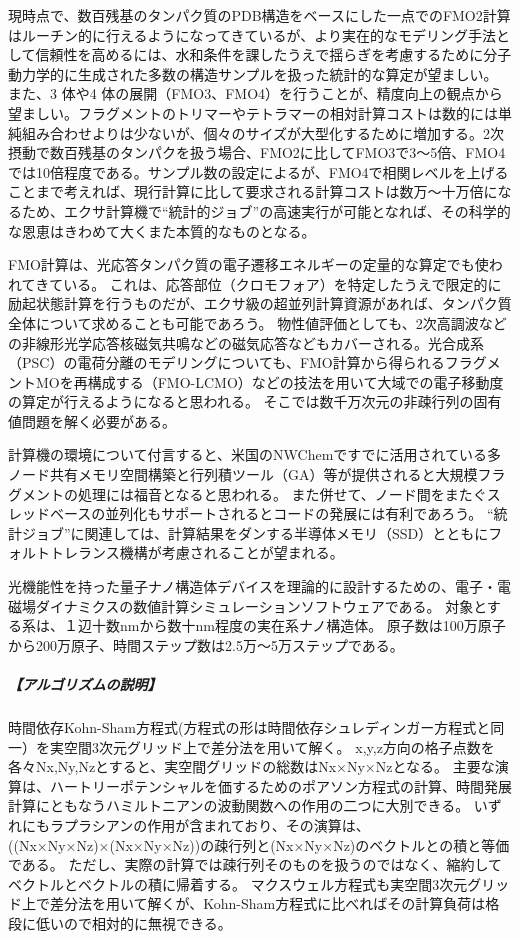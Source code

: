 現時点で、数百残基のタンパク質のPDB構造をベースにした一点でのFMO2計算はルーチン的に行えるようになってきているが、より実在的なモデリング手法として信頼性を高めるには、水和条件を課したうえで揺らぎを考慮するために分子動力学的に生成された多数の構造サンプルを扱った統計的な算定が望ましい。
また、3 体や4 体の展開（FMO3、FMO4）を行うことが、精度向上の観点から望ましい。フラグメントのトリマーやテトラマーの相対計算コストは数的には単純組み合わせよりは少ないが、個々のサイズが大型化するために増加する。2次摂動で数百残基のタンパクを扱う場合、FMO2に比してFMO3で3～5倍、FMO4では10倍程度である。サンプル数の設定によるが、FMO4で相関レベルを上げることまで考えれば、現行計算に比して要求される計算コストは数万～十万倍になるため、エクサ計算機で“統計的ジョブ”の高速実行が可能となれば、その科学的な恩恵はきわめて大くまた本質的なものとなる。

FMO計算は、光応答タンパク質の電子遷移エネルギーの定量的な算定でも使われてきている。
これは、応答部位（クロモフォア）を特定したうえで限定的に励起状態計算を行うものだが、エクサ級の超並列計算資源があれば、タンパク質全体について求めることも可能であろう。
物性値評価としても、2次高調波などの非線形光学応答核磁気共鳴などの磁気応答などもカバーされる。光合成系（PSC）の電荷分離のモデリングについても、FMO計算から得られるフラグメントMOを再構成する（FMO-LCMO）などの技法を用いて大域での電子移動度の算定が行えるようになると思われる。
そこでは数千万次元の非疎行列の固有値問題を解く必要がある。

計算機の環境について付言すると、米国のNWChemですでに活用されている多ノード共有メモリ空間構築と行列積ツール（GA）等が提供されると大規模フラグメントの処理には福音となると思われる。
また併せて、ノード間をまたぐスレッドベースの並列化もサポートされるとコードの発展には有利であろう。
“統計ジョブ”に関連しては、計算結果をダンする半導体メモリ（SSD）とともにフォルトトレランス機構が考慮されることが望まれる。

光機能性を持った量子ナノ構造体デバイスを理論的に設計するための、電子・電磁場ダイナミクスの数値計算シミュレーションソフトウェアである。
対象とする系は、１辺十数nmから数十nm程度の実在系ナノ構造体。
原子数は100万原子から200万原子、時間ステップ数は2.5万～5万ステップである。

\subparagraph{【アルゴリズムの説明】}
時間依存Kohn-Sham方程式(方程式の形は時間依存シュレディンガー方程式と同一）を実空間3次元グリッド上で差分法を用いて解く。
x,y,z方向の格子点数を各々Nx,Ny,Nzとすると、実空間グリッドの総数はNx×Ny×Nzとなる。
主要な演算は、ハートリーポテンシャルを価するためのポアソン方程式の計算、時間発展計算にともなうハミルトニアンの波動関数への作用の二つに大別できる。
いずれにもラプラシアンの作用が含まれており、その演算は、((Nx×Ny×Nz)×(Nx×Ny×Nz))の疎行列と(Nx×Ny×Nz)のベクトルとの積と等価である。
ただし、実際の計算では疎行列そのものを扱うのではなく、縮約してベクトルとベクトルの積に帰着する。
マクスウェル方程式も実空間3次元グリッド上で差分法を用いて解くが、Kohn-Sham方程式に比べればその計算負荷は格段に低いので相対的に無視できる。

